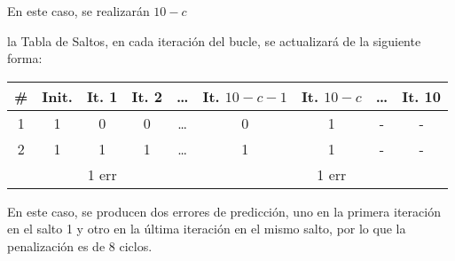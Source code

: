 \begin{ejercicio}
\begin{enumerate}
\begin{itemize}
        En este caso, se realizarán $10-c$ 
        
        la Tabla de Saltos, en cada iteración del bucle, se actualizará de la siguiente forma:
        \begin{center}
            \begin{tabular}{|c|c|c|c|c|c|c|c|c|}
                \hline
                \# & Init. & It. 1& It. 2 & \dots & It. $10-c-1$ & It. $10-c$ & \dots & It. 10\\
                \hline
                1 & 1 & 0 & 0 & \dots & 0 & 1 & - & - \\
                2 & 1 & 1 & 1 & \dots & 1 & 1 & - & - \\
                \hline \hline
                & & 1 err & & & & 1 err & &\\
                \hline
            \end{tabular}
        \end{center}

        En este caso, se producen dos errores de predicción, uno en la primera iteración en el salto 1 y otro en la última iteración en el mismo salto, por lo que la penalización es de $8$ ciclos.
    \end{itemize}
\end{enumerate}
\end{ejercicio}

